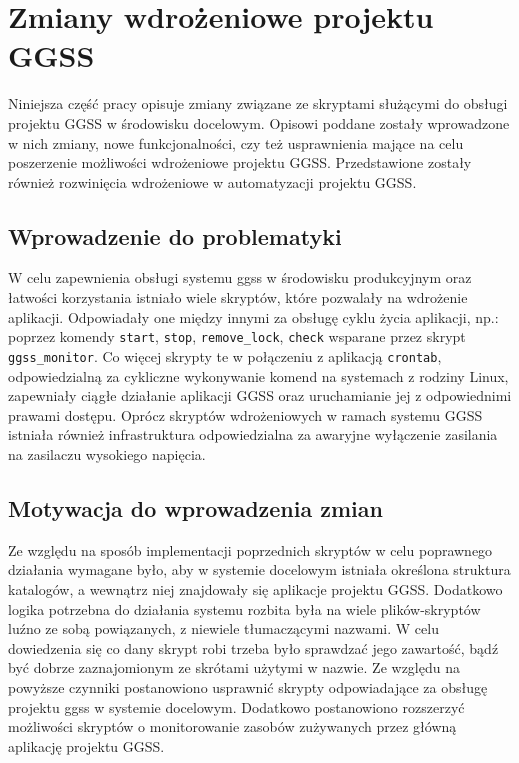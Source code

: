 \clearpage
\section{Zmiany wdrożeniowe projektu GGSS}
\label{ch:scripts}


Niniejsza część pracy opisuje zmiany związane ze skryptami służącymi do obsługi projektu GGSS w środowisku docelowym. Opisowi poddane zostały wprowadzone w nich zmiany, nowe funkcjonalności, czy też usprawnienia mające na celu poszerzenie możliwości wdrożeniowe projektu GGSS. Przedstawione zostały również rozwinięcia wdrożeniowe w automatyzacji projektu GGSS.

\subsection{Wprowadzenie do problematyki}

W celu zapewnienia obsługi systemu ggss w środowisku produkcyjnym oraz łatwości korzystania istniało wiele skryptów, które pozwalały na wdrożenie aplikacji. Odpowiadały one między innymi za obsługę cyklu życia aplikacji, np.: poprzez komendy \lstinline{start}, \lstinline{stop}, \lstinline{remove_lock}, \lstinline{check} wsparane przez skrypt \lstinline{ggss_monitor}. Co więcej skrypty te w połączeniu z aplikacją \lstinline{crontab}, odpowiedzialną za cykliczne wykonywanie komend na systemach z rodziny Linux, zapewniały ciągłe działanie aplikacji GGSS oraz uruchamianie jej z odpowiednimi prawami dostępu. Oprócz skryptów wdrożeniowych w ramach systemu GGSS istniała również infrastruktura odpowiedzialna za awaryjne wyłączenie zasilania na zasilaczu wysokiego napięcia.

\subsection{Motywacja do wprowadzenia zmian}
\label{sec:scripts_motiv}

Ze względu na sposób implementacji poprzednich skryptów w celu poprawnego działania wymagane było, aby w systemie docelowym istniała określona struktura katalogów, a wewnątrz niej znajdowały się aplikacje projektu GGSS. Dodatkowo logika potrzebna do działania systemu rozbita była na wiele plików-skryptów luźno ze sobą powiązanych, z niewiele tłumaczącymi nazwami. W celu dowiedzenia się co dany skrypt robi trzeba było sprawdzać jego zawartość, bądź być dobrze zaznajomionym ze skrótami użytymi w nazwie. Ze względu na powyższe czynniki postanowiono usprawnić skrypty odpowiadające za obsługę projektu ggss w systemie docelowym. Dodatkowo postanowiono rozszerzyć możliwości skryptów o monitorowanie zasobów zużywanych przez główną aplikację projektu GGSS.

